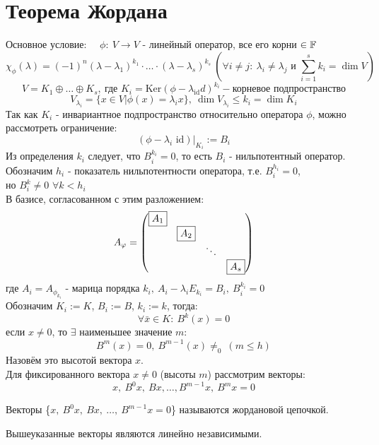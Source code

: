 \section{Теорема Жордана}
    Основное условие: \ \  $\phi: \ V \to V$ - линейный оператор, все его корни $\in \mathbb F$
    $$\chi_{\phi}(\lambda) = (-1)^n(\lambda-\lambda_1)^{k_1}\cdot\ldots\cdot(\lambda-\lambda_s)^{k_s} \ (\forall i\neq j: \ \lambda_i\neq\lambda_j \text{ и } \sum \limits_{i=1}^s k_i = \dim V)$$
    $$V = K_1\oplus\ldots\oplus K_s, \ \text{где } K_i = \text{Ker}(\phi-\lambda_\text{id}d)^{k_i} - \text{корневое подпространство}$$
    $$V_{\lambda_i} = \{x\in V|\phi(x) = \lambda_ix\}, \  \dim V_{\lambda_i}\leqslant k_i = \dim K_i$$
    Так как $K_i$ - инвариантное подпространство относительно оператора $\phi$, можно рассмотреть ограничение: 
    $$(\phi-\lambda_i \text{ id})|_{K_i} := B_i$$
    Из определения $k_i$ следует, что $B_i^{k_i}=0$, то есть $B_i$ - нильпотентный оператор.\\
    Обозначим $h_i$ - показатель нильпотентности оператора, т.е. $B_i^{h_i}=0$,\\ 
    но $B_i^k\neq0$ $\forall k < h_i$\\
    В базисе, согласованном с этим разложением: 
    $$A_{\phi} = \begin{pmatrix}
    \text{\fbox{$A_1$}}\\
    \null & \text{\fbox{$A_2$}}\\
    \null & \null & \ddots\\
    \null & \null & \null & \text{\fbox{$A_s$}}
    \end{pmatrix}$$
    где $A_i = A_{\phi_{k_i}}$ - марица порядка $k_i, \  A_i-\lambda_iE_{k_i} = B_i, \ B_i^{k_i}=0$\\
    Обозначим $K_i :=K$, $B_i :=B$, $k_i :=k$, тогда: 
    $$\forall \bar{x}\in K: \  B^k(x) = 0$$
    если $x\neq0$, то $\exists$ наименьшее значение $m$: 
    $$B^m(x) = 0, \ B^{m-1}(x)\neq_0 \ (m\leqslant h)$$ 
    Назовём это высотой вектора $x$.\\
    Для фиксированного вектора $x\neq0$ (высоты $m$) рассмотрим векторы: 
    $$x, \ B^0x, \ Bx, \ldots,B^{m-1}x, \ B^mx = 0$$
    \begin{definition}
        Векторы \{$x,\ B^0x,\ Bx,\ \ldots,\  B^{m-1}x = 0$\} называются жордановой цепочкой.
    \end{definition}  
    \begin{lemma}
        Вышеуказанные векторы являются линейно независимыми.
    \end{lemma}
